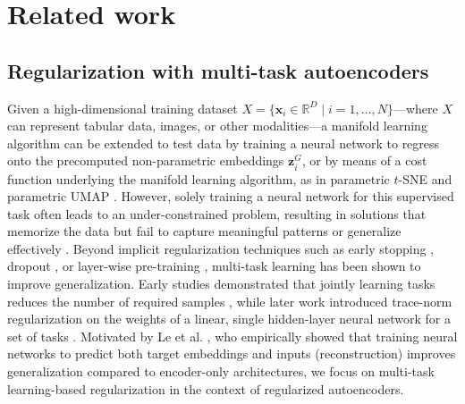 \section{Related work}
\subsection{Regularization with multi-task autoencoders}\label{subsec:multitask_autoencoders}
Given a high-dimensional training dataset \( X = \{\mathbf{x}_i \in \mathbb{R}^D \mid i = 1, \hdots, N\} \)—where \( X \) can represent tabular data, images, or other modalities—a manifold learning algorithm can be extended to test data by training a neural network to regress onto the precomputed non-parametric embeddings $\mathbf{z}_i^G$, or by means of a cost function underlying the manifold learning algorithm, as in parametric  $t$-SNE \cite{maaten2009parametric_tsne} and parametric UMAP \cite{sainburg2021parametric_umap}. However, solely training a neural network for this supervised task often leads to an under-constrained problem, resulting in solutions that memorize the data but fail to capture meaningful patterns or generalize effectively \cite{zhang2016understanding, arpit2017closer}. Beyond implicit regularization techniques such as early stopping \cite{bourlard1989early}, dropout \cite{Wager2013dropout}, or layer-wise pre-training \cite{Bengio2006pretraining}, multi-task learning \cite{Caruana1997multitask} has been shown to improve generalization. Early studies demonstrated that jointly learning tasks reduces the number of required samples \cite{baxter1995learning, baxter2000inductive_bias}, while later work introduced trace-norm regularization on the weights of a linear, single hidden-layer neural network for a set of tasks \cite{Maurer2006multitask, pontil2013multitask}. Motivated by Le et al. , who empirically showed that training neural networks to predict both target embeddings and inputs (reconstruction) improves generalization compared to encoder-only architectures, we focus on multi-task learning-based regularization in the context of regularized autoencoders.

